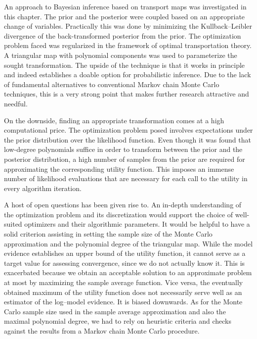 An approach to Bayesian inference based on transport maps was investigated in this chapter.
The prior and the posterior were coupled based on an appropriate change of variables.
Practically this was done by minimizing the Kullback--Leibler divergence of the back-transformed posterior from the prior.
The optimization problem faced was regularized in the framework of optimal transportation theory.
A triangular map with polynomial components was used to parameterize the sought transformation.
The upside of the technique is that it works in principle and indeed establishes a doable option for probabilistic inference.
Due to the lack of fundamental alternatives to conventional Markov chain Monte Carlo techniques, this is a very strong point that makes further research attractive and needful.
\par %
On the downside, finding an appropriate transformation comes at a high computational price.
The optimization problem posed involves expectations under the prior distribution over the likelihood function.
Even though it was found that low-degree polynomials suffice in order to transform between the prior and the posterior distribution,
a high number of samples from the prior are required for approximating the corresponding utility function.
This imposes an immense number of likelihood evaluations that are necessary for each call to the utility in every algorithm iteration.
\par %
A host of open questions has been given rise to.
An in-depth understanding of the optimization problem and its discretization would support the choice of well-suited optimizers and their algorithmic parameters.
It would be helpful to have a solid criterion assisting in setting the sample size of the Monte Carlo approximation and the polynomial degree of the triangular map.
While the model evidence establishes an upper bound of the utility function, it cannot serve as a target value for assessing convergence, since we do not actually know it.
This is exacerbated because we obtain an acceptable solution to an approximate problem at most by maximizing the sample average function.
Vice versa, the eventually obtained maximum of the utility function does not necessarily serve well as an estimator of the log--model evidence.
It is biased downwards.
As for the Monte Carlo sample size used in the sample average approximation and also the maximal polynomial degree,
we had to rely on heuristic criteria and checks against the results from a Markov chain Monte Carlo procedure.
